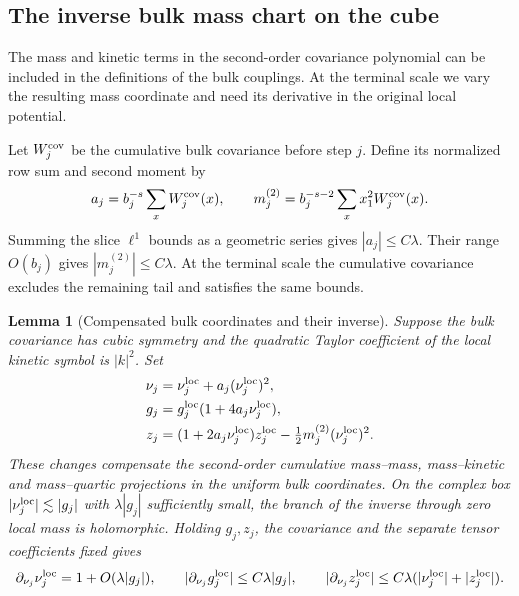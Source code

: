 \documentclass[11pt]{article}
\newtheorem{lemma}[theorem]{Lemma}
\theoremstyle{definition}
\begin{document}
\subsection{The inverse bulk mass chart on the cube}
\label{sec:cube-mass-chart}

The mass and kinetic terms in the second-order covariance polynomial
can be included in the definitions of the bulk couplings. At the
terminal scale we vary the resulting mass coordinate and need its
derivative in the original local potential.

Let \(W_j^{\rm cov}\) be the cumulative bulk covariance before step
\(j\). Define its normalized row sum and second moment by
\begin{equation}
 a_j=b_j^{-s}\sum_x W_j^{\rm cov}(x),\qquad
 m_j^{(2)}=b_j^{-s-2}\sum_x x_1^2 W_j^{\rm cov}(x).
\end{equation}
Summing the slice \(\ell^1\) bounds as a geometric series gives
\(|a_j|\le C\lambda\). Their range \(O(b_j)\) gives
\(|m_j^{(2)}|\le C\lambda\). At the terminal scale the cumulative
covariance excludes the remaining tail and satisfies the same bounds.

\begin{lemma}[Compensated bulk coordinates and their inverse]
\label{lem:cube-inverse-mass}
Suppose the bulk covariance has cubic symmetry and the quadratic
Taylor coefficient of the local kinetic symbol is \(|k|^2\). Set
\begin{equation}
 \begin{aligned}
 \nu_j &= \nu_j^{\rm loc}+a_j(\nu_j^{\rm loc})^2,\\
 g_j &=g_j^{\rm loc}(1+4a_j\nu_j^{\rm loc}),\\
 z_j &=(1+2a_j\nu_j^{\rm loc})z_j^{\rm loc}
               -\tfrac12m_j^{(2)}(\nu_j^{\rm loc})^2 .
 \end{aligned}
\end{equation}
These changes compensate the second-order cumulative mass--mass,
mass--kinetic and mass--quartic projections in the uniform bulk
coordinates. On the complex box \(|\nu_j^{\rm loc}|\lesssim |g_j|\)
with \(\lambda |g_j|\) sufficiently small, the branch of the inverse
through zero local mass is holomorphic. Holding \(g_j,z_j\), the
covariance and the separate tensor coefficients fixed gives
\begin{equation}
 \partial_{\nu_j}\nu_j^{\rm loc}=1+O(\lambda |g_j|),\qquad
 |\partial_{\nu_j}g_j^{\rm loc}|\le C\lambda |g_j|,\qquad
 |\partial_{\nu_j}z_j^{\rm loc}|
       \le C\lambda (|\nu_j^{\rm loc}|+|z_j^{\rm loc}|).
\end{equation}
\end{lemma}
\end{document}
